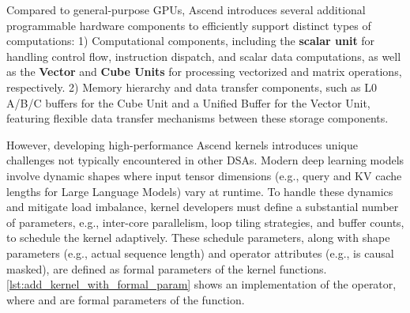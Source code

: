 Compared to general-purpose GPUs, Ascend introduces several additional programmable hardware components to efficiently support distinct types of computations:
1) Computational components, including the \textbf{scalar unit} for handling control flow, instruction dispatch, and scalar data computations, as well as the \textbf{Vector} and \textbf{Cube Units} for processing vectorized and matrix operations, respectively.
2) Memory hierarchy and data transfer components, such as L0 A/B/C buffers for the Cube Unit and a Unified Buffer for the Vector Unit, featuring flexible data transfer mechanisms between these storage components.

However, developing high-performance Ascend kernels introduces unique challenges not typically encountered in other DSAs.
Modern deep learning models involve dynamic shapes where input tensor dimensions (e.g., query and KV cache lengths for Large Language Models) vary at runtime.
To handle these dynamics and mitigate load imbalance, kernel developers must define a substantial number of parameters, e.g., inter-core parallelism, loop tiling strategies, and buffer counts, to schedule the kernel adaptively.
These schedule parameters, along with shape parameters (e.g., actual sequence length) and operator attributes (e.g., is causal masked), are defined as formal parameters of the kernel functions.
\autoref{lst:add_kernel_with_formal_param} shows an implementation of the  operator, where  and  are formal parameters of the  function.

